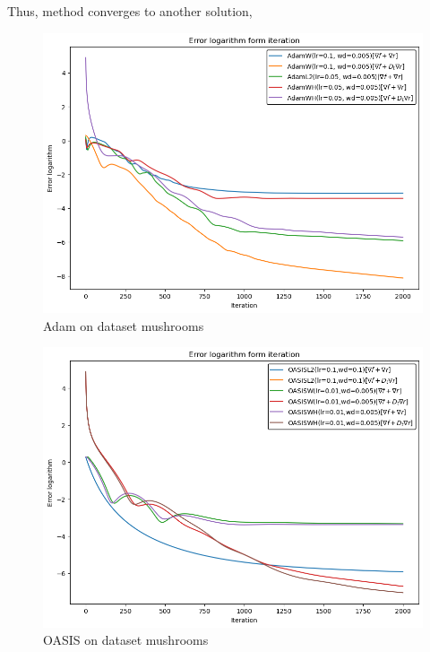 \documentclass{article}
\begin{document}
Thus, method converges to another solution,

\begin{minipage}{0.5\textwidth}
\begin{figure}[H]
\centering
    \includegraphics[width=\textwidth]{pictures/mushrooms/adams_error.png}
    \caption{Adam on dataset mushrooms}
        \label{fig:adams_error}
\end{figure}
\end{minipage}
\hfill
\begin{minipage}{0.5\textwidth}
\begin{figure}[H]
\centering
    \includegraphics[width=\textwidth]{pictures/mushrooms/oasis_error.png}
    \caption{OASIS on dataset mushrooms}
        \label{fig:oasis_error}
\end{figure}
\label{fig:error}
\end{minipage}
\end{document}
